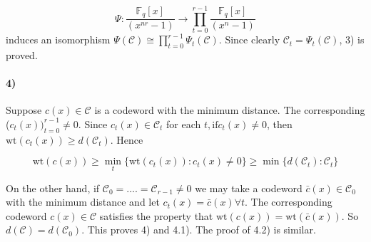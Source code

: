 \documentclass[fontsize=12pt]{article}
\begin{document}
$$ \Psi : \frac{\mathbb{F}_q[x]}{(x^{nr} - 1)} \rightarrow \prod_{t=0}^{r-1}\frac{\mathbb{F}_q[x]}{(x^{n} - 1)}  $$
induces an isomorphism $\Psi(\mathcal{C}) \cong \prod_{t=0}^{r-1} \Psi_t(\mathcal{C})$. Since clearly $\mathcal{C}_t = \Psi_t(\mathcal{C})$, 3) is proved.
\paragraph{4)}
Suppose $c(x) \in \mathcal{C}$ is a codeword with the minimum
distance. The corresponding ($c_t(x))_{t=0}^{r-1} \neq 0$. Since $c_t (x) \in \mathcal{C}_t$
for each $t, \text{if} c_t (x) \neq 0$, then $\text{wt}(c_t (x)) \geq d(\mathcal{C}_t )$. Hence

$$  \text{wt}(c (x)) \geq \min_t \{\text{wt}(c_t (x)) : c_t(x) \neq 0\}  \geq \min\{ d(\mathcal{C}_t) : \mathcal{C}_t \} $$

On the other hand, if $\mathcal{C}_0 = .... = \mathcal{C}_{r-1} \neq 0$ we may
take a codeword $ \bar{c}(x) \in \mathcal{C}_0$ with the minimum distance and
let $c_t (x) = \bar{c}(x) \forall t$. The corresponding codeword
$c(x) \in \mathcal{C}$ satisfies the property that $\text{wt}(c(x)) = \text{wt}(\bar{c}(x))$.
So $d(\mathcal{C}) = d(\mathcal{C}_0)$. This proves 4) and 4.1). The proof of 4.2) is
similar.
\end{document}

